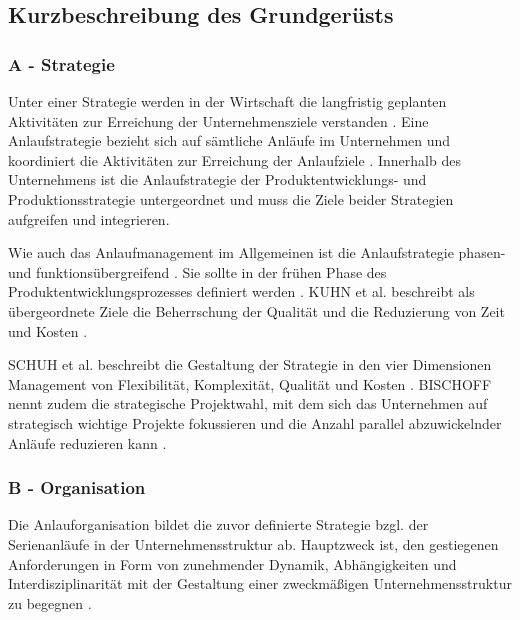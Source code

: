 \subsection*{Kurzbeschreibung des Grundgerüsts}

% 

\subsubsection*{A - Strategie}
Unter einer Strategie werden in der Wirtschaft die langfristig geplanten Aktivitäten zur Erreichung der Unternehmensziele verstanden \autocite[12]{Schuh2008}. %
% 
Eine Anlaufstrategie bezieht sich auf sämtliche Anläufe im Unternehmen und koordiniert die Aktivitäten zur Erreichung der Anlaufziele \autocite[4]{Schuh2008}. Innerhalb des Unternehmens ist die Anlaufstrategie der Produktentwicklungs- und Produktionsstrategie untergeordnet und muss die Ziele beider Strategien aufgreifen und integrieren. 
	

Wie auch das Anlaufmanagement im Allgemeinen ist die Anlaufstrategie phasen- und funktionsübergreifend \autocite{Pfohl2000}. 
Sie sollte in der frühen Phase des Produktentwicklungsprozesses definiert werden \autocite{Schuh2004}. 
KUHN et al. beschreibt als übergeordnete Ziele die Beherrschung der Qualität und die Reduzierung von Zeit und Kosten \autocite[4]{Kuhn2002}. 

SCHUH et al. beschreibt die Gestaltung der Strategie in den vier Dimensionen Management von Flexibilität, Komplexität, Qualität und Kosten \autocite[13]{Schuh2008}. BISCHOFF nennt zudem die strategische Projektwahl, mit dem sich das Unternehmen auf strategisch wichtige Projekte fokussieren und die Anzahl parallel abzuwickelnder Anläufe reduzieren kann \autocite[43]{Bischoff2007}. 

\subsubsection*{B - Organisation}
Die Anlauforganisation bildet die zuvor definierte Strategie bzgl. der Serienanläufe in der Unternehmensstruktur ab. Hauptzweck ist, den gestiegenen Anforderungen in Form von zunehmender Dynamik, Abhängigkeiten und Interdisziplinarität mit der Gestaltung einer zweckmäßigen Unternehmensstruktur zu begegnen \autocite[55]{Schuh2008}. 

